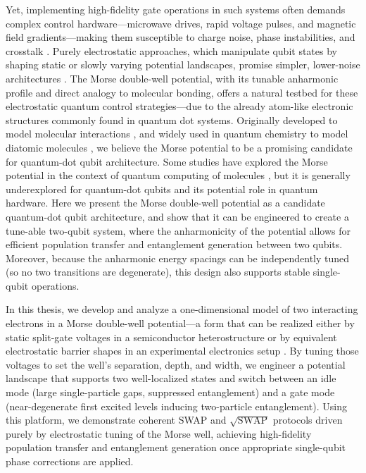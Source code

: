 \documentclass{subfiles}
\begin{document}
Yet, implementing high-fidelity gate operations in such systems often demands complex control hardware—microwave drives, rapid voltage pulses, and magnetic field gradients—making them susceptible to charge noise, phase instabilities, and crosstalk \cite{xue2022quantum, kuhlmann2013charge, heinz2021crosstalk}. Purely electrostatic approaches, which manipulate qubit states by shaping static or slowly varying potential landscapes, promise simpler, lower-noise architectures \cite{veldhorst2014addressable, leinonen2024coulomb}. The Morse double-well potential, with its tunable anharmonic profile and direct analogy to molecular bonding, offers a natural testbed for these electrostatic quantum control strategies—due to the already atom-like electronic structures commonly found in quantum dot systems. Originally developed to model molecular interactions \cite{morse1929diatomic}, and widely used in quantum chemistry to model diatomic molecules \cite{piela2006ideas}, we believe the Morse potential to be a promising candidate for quantum-dot qubit architecture. Some studies have explored the Morse potential in the context of quantum computing of molecules \cite{apanavicius2021morse}, but it is generally underexplored for quantum-dot qubits and its potential role in quantum hardware. Here we present the Morse double-well potential as a candidate quantum-dot qubit architecture, and show that it can be engineered to create a tune-able two-qubit system, where the anharmonicity of the potential allows for efficient population transfer and entanglement generation between two qubits. Moreover, because the anharmonic energy spacings can be independently tuned (so no two transitions are degenerate), this design also supports stable single-qubit operations.

In this thesis, we develop and analyze a one-dimensional model of two interacting electrons in a Morse double-well potential—a form that can be realized either by static split-gate voltages in a semiconductor heterostructure or by equivalent electrostatic barrier shapes in an experimental electronics setup \cite{smet2002gate, leinonen2024coulomb}. By tuning those voltages to set the well's separation, depth, and width, we engineer a potential landscape that supports two well-localized states and switch between an idle mode (large single-particle gaps, suppressed entanglement) and a gate mode (near-degenerate first excited levels inducing two-particle entanglement). Using this platform, we demonstrate coherent SWAP and $\sqrt{\text{SWAP}}$ protocols driven purely by electrostatic tuning of the Morse well, achieving high-fidelity population transfer and entanglement generation once appropriate single-qubit phase corrections are applied.
\end{document}
